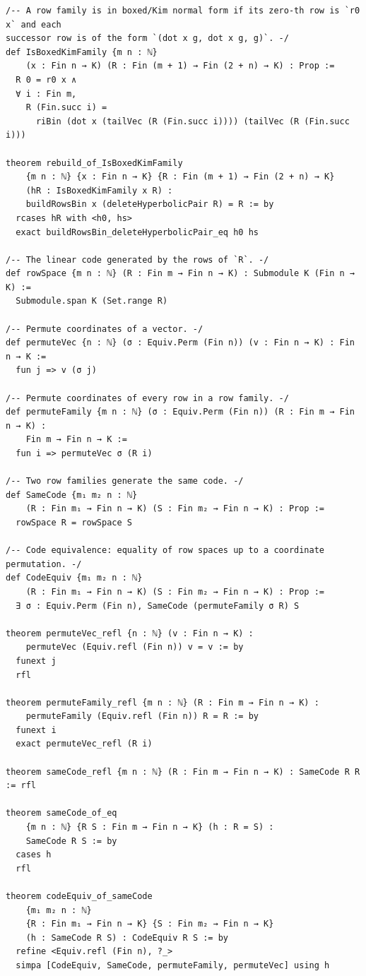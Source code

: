 \documentclass[12pt]{article}
\begin{document}
\begin{lstlisting}[caption={Lean verification for Theorem~\ref{thm:CZ_Kim_Lagrangian}.}]
/-- A row family is in boxed/Kim normal form if its zero-th row is `r0 x` and each
successor row is of the form `(dot x g, dot x g, g)`. -/
def IsBoxedKimFamily {m n : ℕ}
    (x : Fin n → K) (R : Fin (m + 1) → Fin (2 + n) → K) : Prop :=
  R 0 = r0 x ∧
  ∀ i : Fin m,
    R (Fin.succ i) =
      riBin (dot x (tailVec (R (Fin.succ i)))) (tailVec (R (Fin.succ i)))

theorem rebuild_of_IsBoxedKimFamily
    {m n : ℕ} {x : Fin n → K} {R : Fin (m + 1) → Fin (2 + n) → K}
    (hR : IsBoxedKimFamily x R) :
    buildRowsBin x (deleteHyperbolicPair R) = R := by
  rcases hR with <h0, hs>
  exact buildRowsBin_deleteHyperbolicPair_eq h0 hs

/-- The linear code generated by the rows of `R`. -/
def rowSpace {m n : ℕ} (R : Fin m → Fin n → K) : Submodule K (Fin n → K) :=
  Submodule.span K (Set.range R)

/-- Permute coordinates of a vector. -/
def permuteVec {n : ℕ} (σ : Equiv.Perm (Fin n)) (v : Fin n → K) : Fin n → K :=
  fun j => v (σ j)

/-- Permute coordinates of every row in a row family. -/
def permuteFamily {m n : ℕ} (σ : Equiv.Perm (Fin n)) (R : Fin m → Fin n → K) :
    Fin m → Fin n → K :=
  fun i => permuteVec σ (R i)

/-- Two row families generate the same code. -/
def SameCode {m₁ m₂ n : ℕ}
    (R : Fin m₁ → Fin n → K) (S : Fin m₂ → Fin n → K) : Prop :=
  rowSpace R = rowSpace S

/-- Code equivalence: equality of row spaces up to a coordinate permutation. -/
def CodeEquiv {m₁ m₂ n : ℕ}
    (R : Fin m₁ → Fin n → K) (S : Fin m₂ → Fin n → K) : Prop :=
  ∃ σ : Equiv.Perm (Fin n), SameCode (permuteFamily σ R) S

theorem permuteVec_refl {n : ℕ} (v : Fin n → K) :
    permuteVec (Equiv.refl (Fin n)) v = v := by
  funext j
  rfl

theorem permuteFamily_refl {m n : ℕ} (R : Fin m → Fin n → K) :
    permuteFamily (Equiv.refl (Fin n)) R = R := by
  funext i
  exact permuteVec_refl (R i)

theorem sameCode_refl {m n : ℕ} (R : Fin m → Fin n → K) : SameCode R R := rfl

theorem sameCode_of_eq
    {m n : ℕ} {R S : Fin m → Fin n → K} (h : R = S) :
    SameCode R S := by
  cases h
  rfl

theorem codeEquiv_of_sameCode
    {m₁ m₂ n : ℕ}
    {R : Fin m₁ → Fin n → K} {S : Fin m₂ → Fin n → K}
    (h : SameCode R S) : CodeEquiv R S := by
  refine <Equiv.refl (Fin n), ?_>
  simpa [CodeEquiv, SameCode, permuteFamily, permuteVec] using h


\end{lstlisting}
\end{document}

